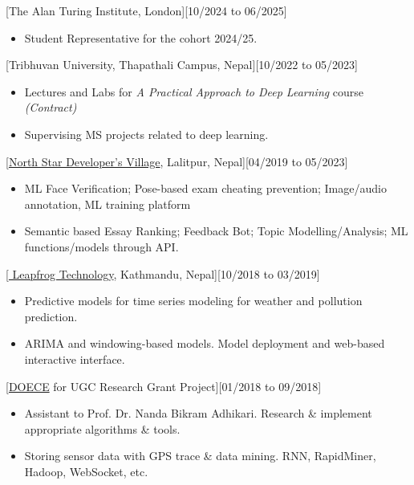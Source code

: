 \documentclass{resumex}
\begin{document}
[The Alan Turing Institute, London][10/2024 to 06/2025]
\begin{itemize}
   \item Student Representative for the cohort 2024/25.
\end{itemize}

[Tribhuvan University, Thapathali Campus, Nepal][10/2022 to 05/2023]
\begin{itemize}
   \item Lectures and Labs for \textit{A Practical Approach to Deep Learning} course \textit{(Contract)}
   \item Supervising MS projects related to deep learning.
\end{itemize}

[\href{https://ublrandd.com.np/}{North Star Developer's Village}, Lalitpur, Nepal][04/2019 to  05/2023]
\begin{itemize}
   \item 	ML Face Verification; Pose-based exam cheating prevention; Image/audio annotation, ML training platform
   \item Semantic based Essay Ranking; Feedback Bot; Topic Modelling/Analysis; ML functions/models through API.
\end{itemize}

[\href{https://www.lftechnology.com/}{ Leapfrog Technology}, Kathmandu, Nepal][10/2018 to 03/2019]
\begin{itemize}
\item	Predictive models for time series modeling for weather and pollution prediction. 
\item ARIMA and windowing-based models. Model deployment and web-based interactive interface.
\end{itemize}

[\href{http://doece.pcampus.edu.np/}{DOECE} for UGC Research Grant Project][01/2018 to 09/2018]
\begin{itemize}
\item	Assistant to Prof. Dr. Nanda Bikram Adhikari. Research \& implement appropriate algorithms \& tools. 
\item Storing sensor data with GPS trace \& data mining. RNN, RapidMiner, Hadoop, WebSocket, etc. 

\end{itemize}
\end{document}
